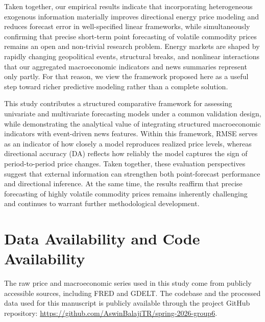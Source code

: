 \documentclass[pdflatex,sn-mathphys-num]{sn-jnl}%
\theoremstyle{thmstyleone}%
\theoremstyle{thmstyletwo}%
\theoremstyle{thmstylethree}%
\begin{document}
Taken together, our empirical results indicate that incorporating heterogeneous exogenous information materially improves directional energy price modeling and reduces forecast error in well-specified linear frameworks, while simultaneously confirming that precise short-term point forecasting of volatile commodity prices remains an open and non-trivial research problem. Energy markets are shaped by rapidly changing geopolitical events, structural breaks, and nonlinear interactions that our aggregated macroeconomic indicators and news summaries represent only partly. For that reason, we view the framework proposed here as a useful step toward richer predictive modeling rather than a complete solution.

This study contributes a structured comparative framework for assessing univariate and multivariate forecasting models under a common validation design, while demonstrating the analytical value of integrating structured macroeconomic indicators with event-driven news features. Within this framework, RMSE serves as an indicator of how closely a model reproduces realized price levels, whereas directional accuracy (DA) reflects how reliably the model captures the sign of period-to-period price changes. Taken together, these evaluation perspectives suggest that external information can strengthen both point-forecast performance and directional inference. At the same time, the results reaffirm that precise forecasting of highly volatile commodity prices remains inherently challenging and continues to warrant further methodological development.

\section*{Data Availability and Code Availability}

The raw price and macroeconomic series used in this study come from publicly accessible sources, including FRED and GDELT. The codebase and the processed data used for this manuscript is publicly available through the project GitHub repository: \url{https://github.com/AswinBalajiTR/spring-2026-group6}.

\end{document}
